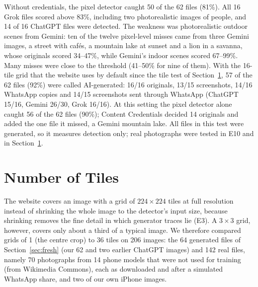 \documentclass{mnnit}
\begin{document}
Without credentials, the pixel detector caught 50 of the 62 files
(81\%). All 16 Grok files scored above 83\%, including two
photorealistic images of people, and 14 of 16 ChatGPT files were
detected. The weakness was photorealistic outdoor scenes from Gemini:
ten of the twelve pixel-level misses came from three Gemini images, a
street with caf\'es, a mountain lake at sunset and a lion in a savanna,
whose originals scored 34--47\%, while Gemini's indoor scenes scored
67--99\%. Many misses were close to the threshold (41--50\% for nine of
them).
With the 16-tile grid that the website uses by default since the tile
test of Section~\ref{sec:tiles}, 57 of the 62 files (92\%) were called
AI-generated: 16/16 originals, 13/15 screenshots, 14/16 WhatsApp copies
and 14/15 screenshots sent through WhatsApp (ChatGPT 15/16, Gemini 26/30,
Grok 16/16). At this setting the pixel detector alone caught 56 of the 62
files (90\%); Content Credentials decided 14 originals and added the one
file it missed, a Gemini mountain lake. All files in this test were generated, so it measures
detection only; real photographs were tested in E10 and in
Section~\ref{sec:tiles}.

\section{Number of Tiles}
\label{sec:tiles}
The website covers an image with a grid of $224\times224$ tiles at full
resolution instead of shrinking the whole image to the detector's input
size, because shrinking removes the fine detail in which generator traces
lie (E3). A $3\times3$ grid, however, covers only about a third of a
typical image. We therefore compared grids of 1 (the centre crop) to 36
tiles on 206 images: the 64 generated files of Section~\ref{sec:fresh}
(our 62 and two earlier ChatGPT images) and 142 real files, namely 70
photographs from 14 phone models that were not used for training (from
Wikimedia Commons), each as downloaded and after a simulated WhatsApp
share, and two of our own iPhone images.
\end{document}
